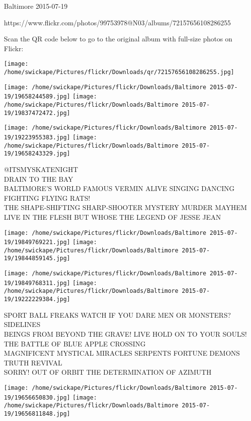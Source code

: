 \documentclass[10pt,letterpaper]{article}
\begin{document}
Baltimore 2015-07-19

https://www.flickr.com/photos/99753978@N03/albums/72157656108286255

Scan the QR code below to go to the original album with full-size photos on Flickr:

\texttt{[image: /home/swickape/Pictures/flickr/Downloads/qr/72157656108286255.jpg]}
\pagebreak

\texttt{[image: /home/swickape/Pictures/flickr/Downloads/Baltimore 2015-07-19/19658244589.jpg]}
\texttt{[image: /home/swickape/Pictures/flickr/Downloads/Baltimore 2015-07-19/19837472472.jpg]}

\texttt{[image: /home/swickape/Pictures/flickr/Downloads/Baltimore 2015-07-19/19223955383.jpg]}
\texttt{[image: /home/swickape/Pictures/flickr/Downloads/Baltimore 2015-07-19/19658243329.jpg]}

@ITSMYSKATENIGHT\\
DRAIN TO THE BAY\\
BALTIMORE'S WORLD FAMOUS VERMIN ALIVE SINGING DANCING FIGHTING FLYING RATS!\\
THE SHAPE{-}SHIFTING SHARP{-}SHOOTER MYSTERY MURDER MAYHEM LIVE IN THE FLESH BUT WHOSE THE LEGEND OF JESSE JEAN\\
\pagebreak

\texttt{[image: /home/swickape/Pictures/flickr/Downloads/Baltimore 2015-07-19/19849769221.jpg]}
\texttt{[image: /home/swickape/Pictures/flickr/Downloads/Baltimore 2015-07-19/19844859145.jpg]}

\texttt{[image: /home/swickape/Pictures/flickr/Downloads/Baltimore 2015-07-19/19849768311.jpg]}
\texttt{[image: /home/swickape/Pictures/flickr/Downloads/Baltimore 2015-07-19/19222229384.jpg]}

SPORT BALL FREAKS WATCH IF YOU DARE MEN OR MONSTERS?  SIDELINES\\
BEINGS FROM BEYOND THE GRAVE!   LIVE HOLD ON TO YOUR SOULS!  THE BATTLE OF BLUE APPLE CROSSING\\
MAGNIFICENT MYSTICAL MIRACLES SERPENTS FORTUNE DEMONS TRUTH REVIVAL\\
SORRY!  OUT OF ORBIT THE DETERMINATION OF AZIMUTH\\
\pagebreak

\texttt{[image: /home/swickape/Pictures/flickr/Downloads/Baltimore 2015-07-19/19656650830.jpg]}
\texttt{[image: /home/swickape/Pictures/flickr/Downloads/Baltimore 2015-07-19/19656811848.jpg]}
\end{document}
